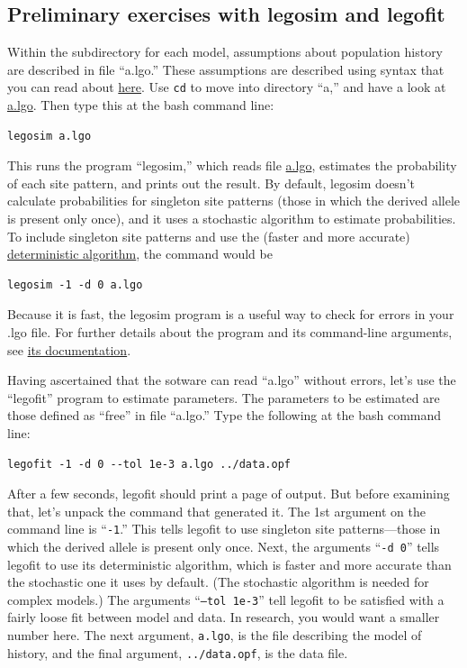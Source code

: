 \documentclass[11pt]{article}
\begin{document}
\subsection{Preliminary exercises with legosim and legofit}
Within the subdirectory for each model, assumptions about population
history are described in file ``a.lgo.''  These assumptions are
described using syntax that you can read about
\href{http://alanrogers.github.io/legofit/html/index.html#lgo}{here}.
Use \texttt{cd} to move into directory ``a,'' and have a look at
\href{https://github.com/alanrogers/agar22/tree/main/legofit/europe/a/a.lgo}{a.lgo}. Then
type this at the bash command line:
\begin{verbatim}
legosim a.lgo
\end{verbatim}
This runs the program ``legosim,'' which reads file
\href{https://github.com/alanrogers/agar22/tree/main/legofit/europe/a/a.lgo}{a.lgo},
estimates the probability of each site pattern, and prints out the
result. By default, legosim doesn't calculate probabilities for
singleton site patterns (those in which the derived allele is present
only once), and it uses a stochastic algorithm to estimate
probabilities. To include singleton site patterns and use the (faster
and more accurate)
\href{https://peercommunityjournal.org/articles/10.24072/pcjournal.132}{deterministic
  algorithm}, the command would be
\begin{verbatim}
legosim -1 -d 0 a.lgo
\end{verbatim}
Because it is fast, the legosim program is a useful way to check for
errors in your .lgo file. For further details about the program and
its command-line arguments, see
\href{http://alanrogers.github.io/legofit/html/legosim.html}{its
  documentation}.

Having ascertained that the sotware can read ``a.lgo'' without errors,
let's use the ``legofit'' program to estimate parameters. The
parameters to be estimated are those defined as ``free'' in file
``a.lgo.'' Type the following at the bash command line:
\begin{verbatim}
legofit -1 -d 0 --tol 1e-3 a.lgo ../data.opf
\end{verbatim}
After a few seconds, legofit should print a page of output. But before
examining that, let's unpack the command that generated it. The 1st
argument on the command line is ``\texttt{-1}.'' This tells legofit to
use singleton site patterns---those in which the derived allele is
present only once. Next, the arguments ``\texttt{-d 0}'' tells legofit
to use its deterministic algorithm, which is faster and more accurate
than the stochastic one it uses by default. (The stochastic algorithm
is needed for complex models.) The arguments ``\texttt{--tol 1e-3}''
tell legofit to be satisfied with a fairly loose fit between model and
data. In research, you would want a smaller number here. The next
argument, \texttt{a.lgo}, is the file describing the model of history,
and the final argument, \texttt{../data.opf}, is the data file.
\end{document}
